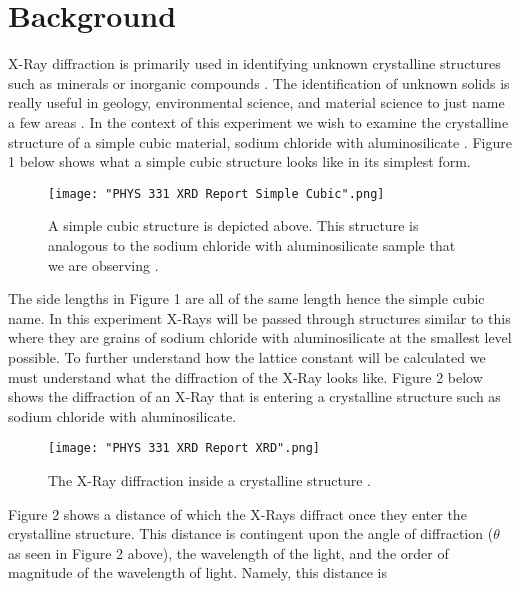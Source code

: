 \documentclass[twocolumn]{article}
\begin{document}
\section*{Background}
X-Ray diffraction is primarily used in identifying unknown crystalline structures such as minerals or inorganic compounds \cite{XRDDiffrac}. The identification of unknown solids is really useful in geology, environmental science, and material science to just name a few areas \cite{XRDDiffrac}. In the context of this experiment we wish to examine the crystalline structure of a simple cubic material, sodium chloride with aluminosilicate \cite{WikiCrystal}. Figure 1 below shows what a simple cubic structure looks like in its simplest form.
\begin{figure}[htbp]
\begin{center}
\texttt{[image: "PHYS 331 XRD Report Simple Cubic".png]}
\caption{A simple cubic structure is depicted above. This structure is analogous to the sodium chloride with aluminosilicate sample that we are observing \cite{WikiCrystal}.}
\label{Fig1}
\end{center}
\end{figure}
\newline
The side lengths in Figure 1 are all of the same length hence the simple cubic name. In this experiment X-Rays will be passed through structures similar to this where they are grains of sodium chloride with aluminosilicate at the smallest level possible.  To further understand how the lattice constant will be calculated we must understand what the diffraction of the X-Ray looks like. Figure 2 below shows the diffraction of an X-Ray that is entering a crystalline structure such as sodium chloride with aluminosilicate.
\begin{figure}[htbp]
\begin{center}
\texttt{[image: "PHYS 331 XRD Report XRD".png]}
\caption{The X-Ray diffraction inside a crystalline structure \cite{X-RayCryst}.}
\label{Fig2}
\end{center}
\end{figure}
\newline
Figure 2 shows a distance of which the X-Rays diffract once they enter the crystalline structure. This distance is contingent upon the angle of diffraction ($\theta$ as seen in Figure 2 above), the wavelength of the light, and the order of magnitude of the wavelength of light. Namely, this distance is
\end{document}
